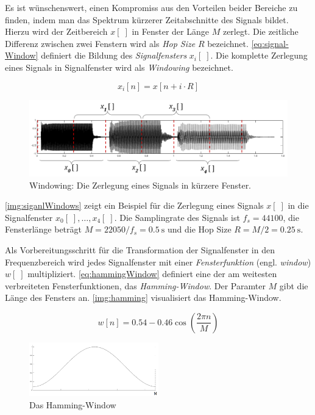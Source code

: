 Es ist wünschenswert, einen Kompromiss aus den Vorteilen beider Bereiche zu finden, indem man das Spektrum kürzerer Zeitabschnitte des Signals bildet. Hierzu wird der Zeitbereich $x[\;]$ in Fenster der Länge $M$ zerlegt. Die zeitliche Differenz zwischen zwei Fenstern wird als \emph{Hop Size} $R$ bezeichnet. \autoref{eq:signal-Window} definiert die Bildung des \emph{Signalfensters} $x_i[\;]$. Die komplette Zerlegung eines Signals in Signalfenster wird als \emph{Windowing} bezeichnet.\cite{juliusSmith}

\begin{equation}
x_{i}[n] = x[n+i\cdot R]
\label{eq:signal-Window}
\end{equation}

\begin{figure}[h]
	\centering
	\includegraphics[width=1\textwidth]{bilder/signalWindows02.png}
	\caption{Windowing: Die Zerlegung eines Signals in kürzere Fenster.}
	\label{img:siganlWindows}
\end{figure}

\autoref{img:siganlWindows} zeigt ein Beispiel für die Zerlegung eines Signals $x[\;]$ in die Signalfenster $x_0[\;] ,\ldots, x_4[\;]$. Die Samplingrate des Signals ist $f_s = 44100$, die Fensterlänge beträgt $M = 22050 / f_s = \SI{0.5}{\second}$ und die Hop Size $R = M / 2= \SI{0.25}{\second}$.

Als Vorbereitungsschritt für die Transformation der Signalfenster in den Frequenzbereich wird jedes Signalfenster mit einer \emph{Fensterfunktion} (engl. \emph{window}) $w[\;]$ multipliziert.\cite[S. 69]{sprachverarbeitung} \autoref{eq:hammingWindow} definiert eine der am weitesten verbreiteten Fensterfunktionen, das \emph{Hamming-Window}. Der Paramter $M$ gibt die Länge des Fensters an. \autoref{img:hamming} visualisiert das Hamming-Window.\cite[S. 286]{dspGuide}

\begin{equation}
w[n] = 0.54 - 0.46 \cos(\frac{2\pi n}{M} )
\label{eq:hammingWindow}
\end{equation}

\begin{figure}[h]
	\centering
	\includegraphics[width=0.5\textwidth]{bilder/hamming01.png}
	\caption{Das Hamming-Window}
	\label{img:hamming}
\end{figure}

